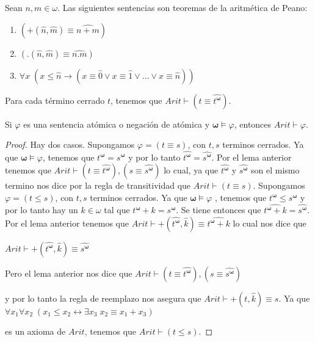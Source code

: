   \begin{lemma} \label{lemma_94}
    \PN Sean $n, m \in \omega$. Las siguientes sentencias son teoremas de la aritmética de Peano:
    \begin{enumerate}
      \item $(+(\widehat{n},\widehat{m})\equiv \widehat{n+m})$
      \item $(.(\widehat{n},\widehat{m})\equiv \widehat{n.m})$
      \item $\forall x \; (x \leq \widehat{n} \rightarrow (x \equiv \widehat{0} \vee x \equiv \widehat{1} \vee \dotsc
        \vee x \equiv \widehat{n}))$
    \end{enumerate}
  \end{lemma}

  \begin{lemma} \label{lemma_95}
    \PN Para cada término cerrado $t$, tenemos que $Arit \vdash (t \equiv \widehat{t^{\mathbf{\omega}}})$.
  \end{lemma}

  \begin{lemma} \label{lemma_96}
    \PN Si $\varphi$ es una sentencia atómica o negación de atómica y $\pmb{\omega} \models \varphi$, entonces $Arit
    \vdash \varphi$.
  \end{lemma}
  \begin{proof}
    Hay dos casos. Supongamos $\varphi =(t\equiv s)$, con $t,s$ terminos cerrados. Ya que $\mathbf{\omega }\models \varphi $, tenemos que $t^{\mathbf{ \omega }}=s^{\mathbf{\omega }}$ y por lo tanto $\widehat{t^{\mathbf{\omega }} }=\widehat{s^{\mathbf{\omega }}}$. Por el lema anterior tenemos que $ Arit\vdash (t\equiv \widehat{t^{\mathbf{\omega }}}),(s\equiv \widehat{s^{ \mathbf{\omega }}})$ lo cual, ya que $\widehat{t^{\mathbf{\omega }}}$ y $ \widehat{s^{\mathbf{\omega }}}$ son el mismo termino nos dice por la regla de transitividad que $Arit\vdash (t\equiv s)$. Supongamos $\varphi =(t\leq s) $, con $t,s$ terminos cerrados. Ya que $\mathbf{\omega }\models \varphi $ , tenemos que $t^{\mathbf{\omega }}\leq s^{\mathbf{\omega }}$ y por lo tanto hay un $k\in \omega $ tal que $t^{\mathbf{\omega }}+k=s^{\mathbf{\omega }}$. Se tiene entonces que $\widehat{t^{\mathbf{\omega }}+k}=\widehat{s^{\mathbf{ \omega }}}$. Por el lema anterior tenemos que $Arit\vdash +(\widehat{t^{ \mathbf{\omega }}},\widehat{k})\equiv \widehat{t^{\mathbf{\omega }}+k}$ lo cual nos dice que

    $\displaystyle Arit\vdash +(\widehat{t^{\mathbf{\omega }}},\widehat{k})\equiv \widehat{s^{ \mathbf{\omega }}} $

    Pero el lema anterior nos dice que
    $\displaystyle Arit\vdash (t\equiv \widehat{t^{\mathbf{\omega }}}),(s\equiv \widehat{s^{ \mathbf{\omega }}}) $

    y por lo tanto la regla de reemplazo nos asegura que $Arit\vdash +(t, \widehat{k})\equiv s$. Ya que
    $\displaystyle \forall x_{1}\forall x_{2}\;(x_{1}\leq x_{2}\leftrightarrow \exists x_{3}\;x_{2}\equiv x_{1}+x_{3}) $

    es un axioma de $Arit$, tenemos que $Arit\vdash (t\leq s)$.
  \end{proof}

